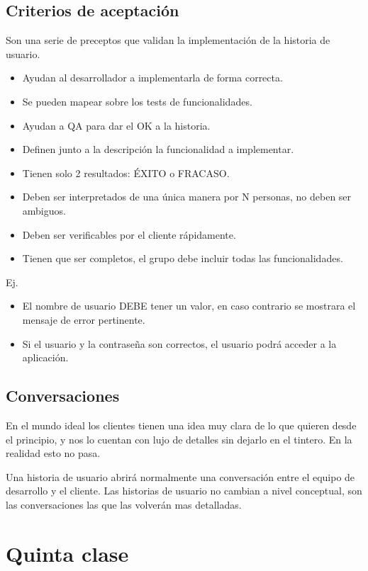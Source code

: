 \documentclass[titlepage,a4paper]{article}
\begin{document}
\subsection*{Criterios de aceptación}
Son una serie de preceptos que validan la implementación de la historia de usuario.
\begin{itemize}
    \item Ayudan al desarrollador a implementarla de forma correcta.
    \item Se pueden mapear sobre los tests de funcionalidades.
    \item Ayudan a QA para dar el OK a la historia.
    \item Definen junto a la descripción la funcionalidad a implementar.
    \item Tienen solo 2 resultados: ÉXITO o FRACASO.
    \item Deben ser interpretados de una única manera por N personas, no deben ser ambiguos.
    \item Deben ser verificables por el cliente rápidamente.
    \item Tienen que ser completos, el grupo debe incluir todas las funcionalidades.
\end{itemize}

Ej.
\begin{itemize}
    \item El nombre de usuario DEBE tener un valor, en caso contrario se mostrara el mensaje de error pertinente.
    \item Si el usuario y la contraseña son correctos, el usuario podrá acceder a la aplicación.
\end{itemize}

\subsection*{Conversaciones}
En el mundo ideal los clientes tienen una idea muy clara de lo que quieren desde el principio, y nos lo cuentan con lujo de detalles sin dejarlo en el tintero. En la realidad esto no pasa.

Una historia de usuario abrirá normalmente una conversación entre el equipo de desarrollo y el cliente. Las historias de usuario no cambian a nivel conceptual, son las conversaciones las que las volverán mas detalladas.


\section*{Quinta clase}
\end{document}
